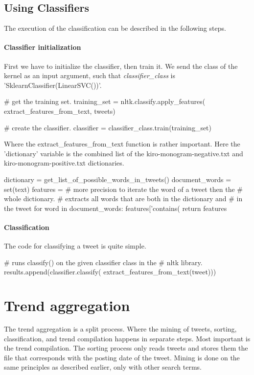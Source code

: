 \subsection{Using Classifiers}\label{code:classifier_classification}
The execution of the classification can be described in the following steps. 

\paragraph{Classifier initialization}
First we have to initialize the classifier, then train it. We send the class of
the kernel as an input argument, such that \textit{classifier\_class} is
'SklearnClassifier(LinearSVC())'.
\begin{python}
# get the training set.
training_set = nltk.classify.apply_features(
    extract_features_from_text,
    tweets)

# create the classifier.
classifier = classifier_class.train(training_set)
\end{python}

Where the extract\_features\_from\_text function is rather important. Here the
'dictionary' variable is the combined list of the kiro-monogram-negative.txt and
kiro-monogram-positive.txt dictionaries.
\begin{python}
dictionary = get_list_of_possible_words_in_tweets()
document_words = set(text)
features = {}
# more precision to iterate the word of a tweet then the 
# whole dictionary.
# extracts all words that are both in the dictionary and 
# in the tweet
for word in document_words:
    features['contains(%
return features
\end{python}

\paragraph{Classification}
The code for classifying a tweet is quite simple. 
\begin{python}
# runs classify() on the given classifier class in the 
# nltk library.
results.append(classifier.classify(
    extract_features_from_text(tweet)))
\end{python}

\section{Trend aggregation}\label{code:trend_aggregation}
The trend aggregation is a split process. Where the mining of tweets, sorting,
classification, and trend compilation happens in separate steps. Most important
is the trend compilation. The sorting process only reads tweets
and stores them the file that corresponds with the posting date of the tweet.
Mining is done on the same principles as described earlier, only with other
search terms. 

